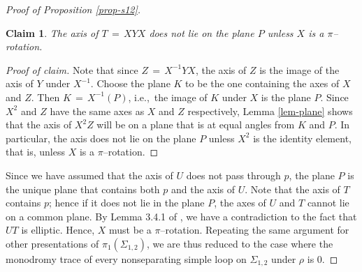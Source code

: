 \documentclass[reqno]{amsart}
\theoremstyle{plain}
\newtheorem{claim}{Claim}
\theoremstyle{definition}
\theoremstyle{remark}
\begin{document}
\begin{proof}[Proof of Proposition \ref{prop-s12}]
\begin{claim}\label{claim-non-coplanar}
The axis of $T \,=\, XYX$ does not lie on the plane $P$  unless $X$ is a $\pi$--rotation. 
\end{claim}

\begin{proof}[Proof of claim] 
Note that since $Z \,=\, X^{-1}YX$,  the axis of $Z$ is the image of the axis of $Y$ under $X^{-1}$.  
Choose the plane $K$ to be the one containing the axes of $X$ and $Z$. 
Then 
$ K\,=\,X^{-1}(P)$, i.e.,\ the image of $K$ under $X$ is the plane $P$.
Since $X^2$ and $Z$ have the same axes as $X$ and $Z$ respectively,  Lemma \ref{lem-plane} shows that the
axis of $X^2Z$ will be on a plane that is at equal angles from $K$ and $P$.  In particular, the axis
does not lie on the plane $P$ unless $X^2$ is the identity element, that is, unless $X$ is a $\pi$--rotation.
\end{proof}

Since we have assumed that the axis of $U$ does not pass through $p$, the plane $P$ is the unique plane that 
contains both $p$ and the axis of $U$. Note that the axis of $T$ contains $p$; hence if it does not lie in the 
plane $P$, the axes of $U$ and $T$ cannot lie on a common plane. By Lemma 3.4.1 of \cite{gkm}, we have a 
contradiction to the fact that $UT$ is elliptic.  Hence, $X$ must be a $\pi$--rotation. Repeating the same 
argument for other presentations of $\pi_1(\Sigma_{1,2})$, we are thus reduced to the case where the monodromy 
trace of every nonseparating simple loop on $\Sigma_{1,2}$ under $\rho$ is $0$.


\end{proof}
\end{document}
